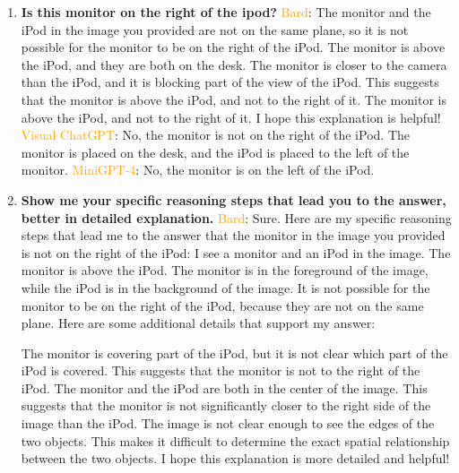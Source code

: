 \begin{enumerate}
    Do you have other questions or requests?
    \subitem \textcolor{orange}{Visual ChatGPT}: The monitor is placed on the desk, and the iPod is placed to the left of the monitor.
    \subitem \textcolor{orange}{MiniGPT-4}: The monitor and the iPod are on a desk, with the monitor in front of the iPod. The monitor is a computer device that displays images and text on a screen, while the iPod is a portable media player that can store and play music and other media files.
    \item \textbf{Is this monitor on the right of the ipod?}
    \subitem \textcolor{orange}{Bard}: The monitor and the iPod in the image you provided are not on the same plane, so it is not possible for the monitor to be on the right of the iPod. The monitor is above the iPod, and they are both on the desk. The monitor is closer to the camera than the iPod, and it is blocking part of the view of the iPod. This suggests that the monitor is above the iPod, and not to the right of it. The monitor is above the iPod, and not to the right of it.
    I hope this explanation is helpful!
    \subitem \textcolor{orange}{Visual ChatGPT}: No, the monitor is not on the right of the iPod. The monitor is placed on the desk, and the iPod is placed to the left of the monitor.
    \subitem \textcolor{orange}{MiniGPT-4}: No, the monitor is on the left of the iPod.
    \item \textbf{Show me your specific reasoning steps that lead you to the answer, better in detailed explanation.}
    \subitem \textcolor{orange}{Bard}: 
    Sure. Here are my specific reasoning steps that lead me to the answer that the monitor in the image you provided is not on the right of the iPod:
    I see a monitor and an iPod in the image.
    The monitor is above the iPod.
    The monitor is in the foreground of the image, while the iPod is in the background of the image.
    It is not possible for the monitor to be on the right of the iPod, because they are not on the same plane.
    Here are some additional details that support my answer:

    The monitor is covering part of the iPod, but it is not clear which part of the iPod is covered. This suggests that the monitor is not to the right of the iPod.
    The monitor and the iPod are both in the center of the image. This suggests that the monitor is not significantly closer to the right side of the image than the iPod.
    The image is not clear enough to see the edges of the two objects. This makes it difficult to determine the exact spatial relationship between the two objects.
    I hope this explanation is more detailed and helpful!


\end{enumerate}
